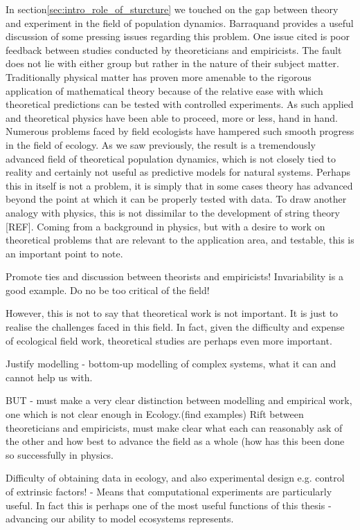 In section\ref{sec:intro_role_of_sturcture} we touched on the gap between theory and experiment in the field of population dynamics. Barraquand \cite{barraquand2014functional} provides a useful  discussion of some pressing issues regarding this problem. One issue cited is poor feedback between studies conducted by theoreticians and empiricists. The fault does not lie with either group but rather in the nature of their subject matter. Traditionally physical matter has proven more amenable to the rigorous application of mathematical theory because of the relative ease with which theoretical predictions can be tested with controlled experiments. As such applied and theoretical physics have been able to proceed, more or less, hand in hand. Numerous problems faced by field ecologists have hampered such smooth progress in the field of ecology. As we saw previously, the result is a tremendously advanced field of theoretical population dynamics, which is not closely tied to reality and certainly not useful as predictive models for natural systems. Perhaps this in itself is not a problem, it is simply that in some cases theory has advanced beyond the point at which it can be properly tested with data. To draw another analogy with physics, this is not dissimilar to the development of string theory [REF]. Coming from a background in physics, but with a desire to work on theoretical problems that are relevant to the application area, and testable, this is an important point to note.      

Promote ties and discussion between theorists and empiricists! Invariability is a good example. Do no be too critical of the field!

However, this is not to say that theoretical work is not important. It is just to realise the challenges faced in this field. In fact, given the difficulty and expense of ecological field work, theoretical studies are perhaps even more important.

Justify modelling - bottom-up modelling of complex systems, what it can and cannot help us with.

BUT - must make a very clear distinction between modelling and empirical work, one which is not clear enough in Ecology.(find examples) Rift between theoreticians and empiricists, must make clear what each can reasonably ask of the other and how best to advance the field as a whole (how has this been done so successfully in physics.

Difficulty of obtaining data in ecology, and also experimental design e.g. control of extrinsic factors! - Means that computational experiments are particularly useful. In fact this is perhaps one of the most useful functions of this thesis - advancing our ability to model ecosystems represents.

